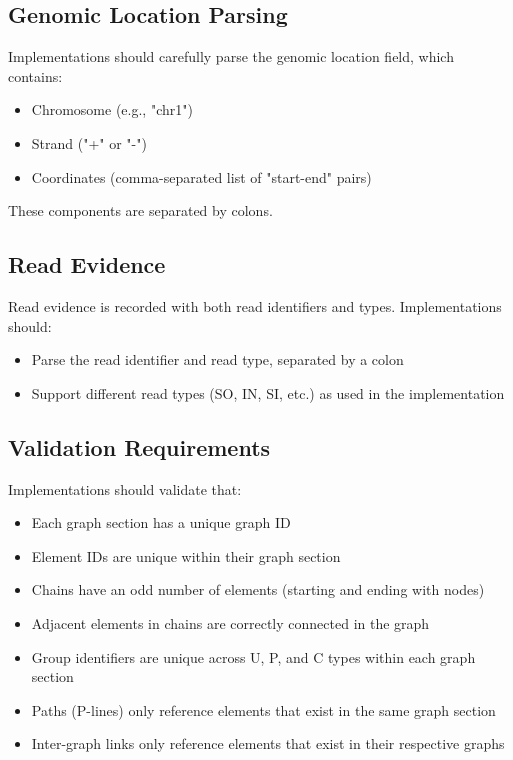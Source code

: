 \documentclass[11pt,a4paper]{article}
\begin{document}
\subsection{Genomic Location Parsing}

Implementations should carefully parse the genomic location field, which contains:

\begin{itemize}[leftmargin=*]
	\item Chromosome (e.g., "chr1")
	\item Strand ("+" or "-")
	\item Coordinates (comma-separated list of "start-end" pairs)
\end{itemize}

These components are separated by colons.

\subsection{Read Evidence}

Read evidence is recorded with both read identifiers and types. Implementations should:

\begin{itemize}[leftmargin=*]
	\item Parse the read identifier and read type, separated by a colon
	\item Support different read types (SO, IN, SI, etc.) as used in the implementation
\end{itemize}

\subsection{Validation Requirements}

Implementations should validate that:

\begin{itemize}[leftmargin=*]
	\item Each graph section has a unique graph ID
	\item Element IDs are unique within their graph section
	\item Chains have an odd number of elements (starting and ending with nodes)
	\item Adjacent elements in chains are correctly connected in the graph
	\item Group identifiers are unique across U, P, and C types within each graph section
	\item Paths (P-lines) only reference elements that exist in the same graph section
	\item Inter-graph links only reference elements that exist in their respective graphs
\end{itemize}
\end{document}
